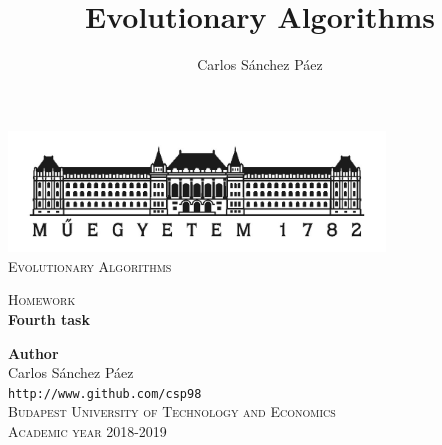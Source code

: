 \documentclass[12pt,english]{article}
\title{Evolutionary Algorithms}
\author{Carlos Sánchez Páez}
\begin{document}
\begin{titlepage}

\newlength{\centeroffset}
\setlength{\centeroffset}{-0.5\oddsidemargin}
\addtolength{\centeroffset}{0.5\evensidemargin}
\thispagestyle{empty}

\noindent\hspace*{\centeroffset}
\begin{minipage}{\textwidth}

\centering
\includegraphics[width=0.75\textwidth]{bme_logo.jpg}\\[1.4cm]

\textsc{ \Large Evolutionary Algorithms\\[4cm]}

\textsc{\Huge Homework}\\[0.75cm]

{\Large\bfseries Fourth task\\}
\end{minipage}

\vspace{8cm}
\noindent\hspace*{\centeroffset}
\begin{minipage}{\textwidth}
\centering

\textbf{Author}\\ {Carlos Sánchez Páez}\\
\texttt{http://www.github.com/csp98}\\[0.5cm]
\textsc{Budapest University of Technology and Economics}\\
\vspace{1cm}
\textsc{Academic year 2018-2019}
\end{minipage}
\end{titlepage}
\thispagestyle{empty}

\newpage
\end{document}

